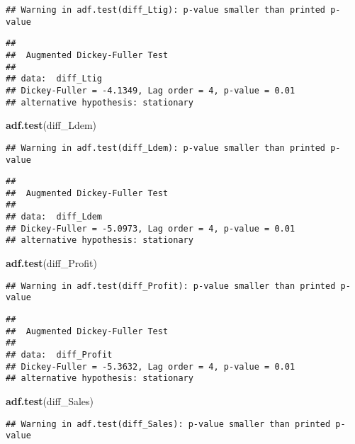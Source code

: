 \documentclass[
]{article}
\newenvironment{Shaded}{\begin{snugshade}}{\end{snugshade}}
\newcommand{\FunctionTok}[1]{\textcolor[rgb]{0.13,0.29,0.53}{\textbf{#1}}}
\newcommand{\NormalTok}[1]{#1}
\begin{document}
\begin{verbatim}
## Warning in adf.test(diff_Ltig): p-value smaller than printed p-value
\end{verbatim}

\begin{verbatim}
## 
##  Augmented Dickey-Fuller Test
## 
## data:  diff_Ltig
## Dickey-Fuller = -4.1349, Lag order = 4, p-value = 0.01
## alternative hypothesis: stationary
\end{verbatim}

\begin{Shaded}
\begin{Highlighting}[]
\FunctionTok{adf.test}\NormalTok{(diff\_Ldem)}
\end{Highlighting}
\end{Shaded}

\begin{verbatim}
## Warning in adf.test(diff_Ldem): p-value smaller than printed p-value
\end{verbatim}

\begin{verbatim}
## 
##  Augmented Dickey-Fuller Test
## 
## data:  diff_Ldem
## Dickey-Fuller = -5.0973, Lag order = 4, p-value = 0.01
## alternative hypothesis: stationary
\end{verbatim}

\begin{Shaded}
\begin{Highlighting}[]
\FunctionTok{adf.test}\NormalTok{(diff\_Profit)}
\end{Highlighting}
\end{Shaded}

\begin{verbatim}
## Warning in adf.test(diff_Profit): p-value smaller than printed p-value
\end{verbatim}

\begin{verbatim}
## 
##  Augmented Dickey-Fuller Test
## 
## data:  diff_Profit
## Dickey-Fuller = -5.3632, Lag order = 4, p-value = 0.01
## alternative hypothesis: stationary
\end{verbatim}

\begin{Shaded}
\begin{Highlighting}[]
\FunctionTok{adf.test}\NormalTok{(diff\_Sales)}
\end{Highlighting}
\end{Shaded}

\begin{verbatim}
## Warning in adf.test(diff_Sales): p-value smaller than printed p-value
\end{verbatim}
\end{document}
